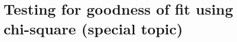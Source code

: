 %
%
%
%
%



\section[Testing for goodness of fit using chi-square (special topic)]{Testing for goodness of fit using\\
    chi-square (special topic)
    ~}
\label{oneWayChiSquare}

